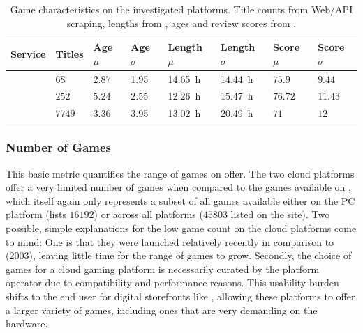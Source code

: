 

% 
% 


\begin{table}
\centering
\caption{Game characteristics on the investigated platforms. Title counts from Web/API scraping, lengths from \hltb, ages and review scores from \metacritic.}
\label{tab:game-stats}
	\begin{tabu}{X[2]|X[r]X[r]X[r]X[r]X[r]X[r]X[r]}
	\toprule
	Service & Titles & Age $\mu$ & Age $\sigma$ & Length $\mu$ & Length $\sigma$ & Score $\mu$ & Score $\sigma$ \\
	\midrule
	\gfnow & $68$ & \SI{2.87}{\year} & \SI{1.95}{\year} & \SI{14.65}{\hour} & \SI{14.44}{\hour} & $75.9$ & $9.44$ \\
	\psnow & $252$ & \SI{5.24}{\year} & \SI{2.55}{\year} & \SI{12.26}{\hour} & \SI{15.47}{\hour} & $76.72$ & $11.43$ \\
	\steam & $7749$ & \SI{3.36}{\year} & \SI{3.95}{\year} & \SI{13.02}{\hour} & \SI{20.49}{\hour} & $71$ & $12$ \\
	\bottomrule
	\end{tabu}
\end{table}


\subsubsection{Number of Games}

This basic metric quantifies the range of games on offer. The two cloud platforms offer a very limited number of games when compared to the games available on \steam, which itself again only represents a subset of all games available either on the PC platform (\metacritic lists $16192$) or across all platforms ($45803$ listed on the site). Two possible, simple explanations for the low game count on the cloud platforms come to mind: One is that they were launched relatively recently in comparison to \steam (2003), leaving little time for the range of games to grow. Secondly, the choice of games for a cloud gaming platform is necessarily curated by the platform operator due to compatibility and performance reasons. This usability burden shifts to the end user for digital storefronts like \steam, allowing these platforms to offer a larger variety of games, including ones that are very demanding on the hardware.


